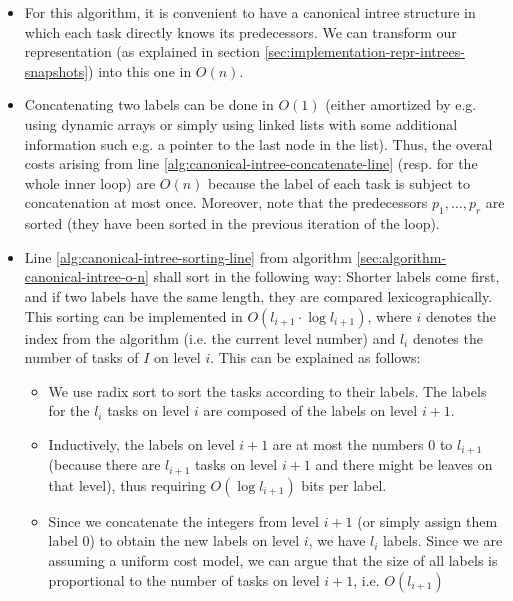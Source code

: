 \begin{itemize}
\item For this algorithm, it is convenient to have a canonical intree structure in which each task directly knows its predecessors. We can transform our representation (as explained in section \ref{sec:implementation-repr-intrees-snapshots}) into this one in $O(n)$.
\item Concatenating two labels can be done in $O(1)$ (either amortized by e.g. using dynamic arrays or simply using linked lists with some additional information such e.g. a pointer to the last node in the list). Thus, the overal costs arising from line \ref{alg:canonical-intree-concatenate-line} (resp. for the whole inner loop) are $O(n)$ because the label of each task is subject to concatenation at most once. Moreover, note that the predecessors $p_1,\dots,p_r$ are sorted (they have been sorted in the previous iteration of the loop).
\item Line \ref{alg:canonical-intree-sorting-line} from algorithm \ref{sec:algorithm-canonical-intree-o-n} shall sort in the following way: Shorter labels come first, and if two labels have the same length, they are compared lexicographically. This sorting can be implemented in $O(l_{i+1}\cdot\log l_{i+1})$, where $i$ denotes the index from the algorithm (i.e. the current level number) and $l_i$ denotes the number of tasks of $I$ on level $i$. This can be explained as follows:
  \begin{itemize}
  \item We use radix sort to sort the tasks according to their labels. The labels for the $l_i$ tasks on level $i$ are composed of the labels on level $i+1$.
  \item Inductively, the labels on level $i+1$ are at most the numbers 0 to $l_{i+1}$ (because there are $l_{i+1}$ tasks on level $i+1$ and there might be leaves on that level), thus requiring $O(\log l_{i+1})$ bits per label.
  \item Since we concatenate the integers from level $i+1$ (or simply assign them label 0) to obtain the new labels on level $i$, we have $l_i$ labels. Since we are assuming a uniform cost model, we can argue that the size of all labels is proportional to the number of tasks on level $i+1$, i.e. $O(l_{i+1})$

\end{itemize}
\end{itemize}
